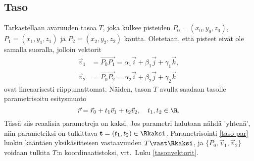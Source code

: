 \subsection{Taso}

Tarkastellaan avaruuden tasoa $T$, joka kulkee pisteiden $P_0=(x_0,y_0,z_0)$,
$P_1=(x_1,y_1,z_1)$ ja $P_2=(x_2,y_2,z_2)$ kautta. Oletetaan, että pisteet eivät ole
samalla suoralla, jolloin vektorit
\begin{align*}
\vec v_1 &= \overrightarrow{P_0P_1} = \alpha_1 \vec i + \beta_1 \vec j + \gamma_1 \vec k, \\
\vec v_2 &= \overrightarrow{P_0P_2} = \alpha_2 \vec i + \beta_2 \vec j + \gamma_2 \vec k
\end{align*}
ovat lineaarisesti riippumattomat. Näiden, tason $T$
%
 avulla saadaan
tasolle parametrisoitu esitysmuoto
\begin{equation} \label{taso par}
\vec r = \vec r_0 + t_1 \vec v_1 + t_2 \vec v_2, \quad t_1, t_2 \in \R.
\end{equation}
%
Tässä siis reaalisia parametreja on kaksi. Jos parametri halutaan nähdä 'yhtenä', niin
parametriksi on tulkittava $\mathbf{t}=(t_1,t_2)\in\Rkaksi$. Parametrisointi \eqref{taso par}
luokin kääntäen yksikäsitteisen vastaavuuden $T\vast\Rkaksi$, ja $\{P_0,\vec v_1,\vec v_2\}$
voidaan tulkita $T$:n koordinaatistoksi, vrt.\ Luku \ref{tasonvektorit}. 


